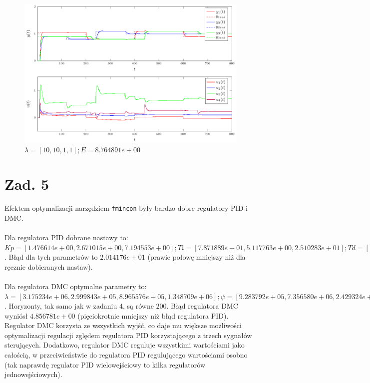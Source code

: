 \documentclass[a4paper,titlepage,11pt,twosides,floatssmall]{mwrep}
\begin{document}
\begin{figure}[H]
	\centering
	\includegraphics[scale=1]{../wykresy/zad4_dmc_3.pdf}
	\caption{$\lambda = [10, 10, 1, 1]; E = 8.764891e+00$}
\end{figure}


\chapter*{Zad. 5}

Efektem optymalizacji narzędziem \verb=fmincon= były bardzo dobre regulatory PID i DMC.\\\\ Dla regulatora PID dobrane nastawy to: $Kp = [1.476614e+00, 2.671015e+00, 7.194553e+00]; Ti = [7.871889e-01, 5.117763e+00, 2.510283e+01]; Td = [1.452739e-05, 1.339040e-05, 5.285899e-06]$. Błąd dla tych parametrów to $2.014176e+01$ (prawie połowę mniejszy niż dla ręcznie dobieranych nastaw).\\\\ Dla regulatora DMC optymalne parametry to: $\lambda = [3.175234e+06, 2.999843e+05, 8.965576e+05, 1.348709e+06]; \psi = [9.283792e+05, 7.356580e+06, 2.429324e+06]$. Horyzonty, tak samo jak w zadaniu 4, są równe $200$. Błąd regulatora DMC wyniósł $4.856781e+00$ (pięciokrotnie mniejszy niż błąd regulatora PID). Regulator DMC korzysta ze wszystkich wyjść, co daje mu większe możliwości optymalizacji regulacji zględem regulatora PID korzystającego z trzech sygnałów sterujących. Dodatkowo, regulator DMC reguluje wszystkimi wartościami jako całością, w przeciwieństwie do regulatora PID regulującego wartościami osobno (tak naprawdę regulator PID wielowejściowy to kilka regulatorów jednowejściowych).
\end{document}
